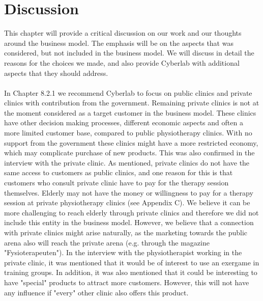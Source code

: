 \chapter{Discussion}
This chapter will provide a critical discussion on our work and our thoughts around the business model. The emphasis will be on the aspects that was considered, but not included in the business model. We will discuss in detail the reasons for the choices we made, and also provide Cyberlab with additional aspects that they should address.  \\ \\
In Chapter 8.2.1 we recommend Cyberlab to focus on public clinics and private clinics with contribution from the government. Remaining private clinics is not at the moment considered as a target customer in the business model. These clinics have other decision making processes, different economic aspects and often a more limited customer base, compared to public physiotherapy clinics. With no support from the government these clinics might have a more restricted economy, which may complicate purchase of new products. This was also confirmed in the interview with the private clinic. As mentioned, private clinics do not have the same access to customers as public clinics, and one reason for this is that customers who consult private clinic have to pay for the therapy session themselves. Elderly may not have the money or willingness to pay for a therapy session at private physiotherapy clinics (see Appendix C). We believe it can be more challenging to reach elderly through private clinics and therefore we did not include this entity in the business model. However, we believe that a connection with private clinics might arise naturally, as the marketing towards the public arena also will reach the private arena (e.g. through the magazine "Fysioterapeuten"). In the interview with the physiotherapist working in the private clinic, it was mentioned that it would be of interest to use an exergame in training groups. In addition, it was also mentioned that it could be interesting to have "special" products to attract more customers. However, this will not have any influence if "every" other clinic also offers this product.\\ \\
